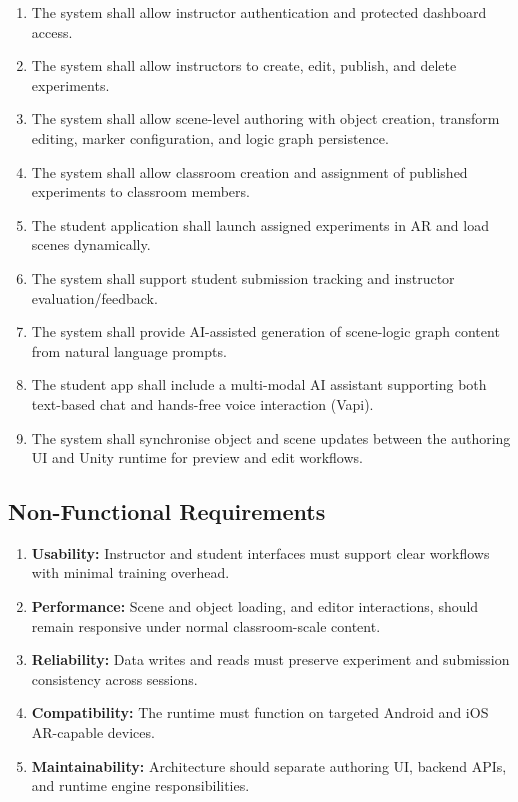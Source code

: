\documentclass[12pt,a4paper]{article}
\begin{document}
\begin{enumerate}[leftmargin=1.4cm]
  \item The system shall allow instructor authentication and protected dashboard access.
  \item The system shall allow instructors to create, edit, publish, and delete experiments.
  \item The system shall allow scene-level authoring with object creation, transform editing,
        marker configuration, and logic graph persistence.
  \item The system shall allow classroom creation and assignment of published experiments
        to classroom members.
  \item The student application shall launch assigned experiments in AR and load scenes
        dynamically.
  \item The system shall support student submission tracking and instructor
        evaluation/feedback.
  \item The system shall provide AI-assisted generation of scene-logic graph content
        from natural language prompts.
  \item The student app shall include a multi-modal AI assistant supporting both text-based
        chat and hands-free voice interaction (Vapi).
  \item The system shall synchronise object and scene updates between the authoring UI
        and Unity runtime for preview and edit workflows.
\end{enumerate}

\subsection{Non-Functional Requirements}

\begin{enumerate}[leftmargin=1.4cm]
  \item \textbf{Usability:} Instructor and student interfaces must support clear workflows
        with minimal training overhead.
  \item \textbf{Performance:} Scene and object loading, and editor interactions, should
        remain responsive under normal classroom-scale content.
  \item \textbf{Reliability:} Data writes and reads must preserve experiment and submission
        consistency across sessions.
  \item \textbf{Compatibility:} The runtime must function on targeted Android and iOS
        AR-capable devices.
  \item \textbf{Maintainability:} Architecture should separate authoring UI, backend APIs,
        and runtime engine responsibilities.
\end{enumerate}
\end{document}
